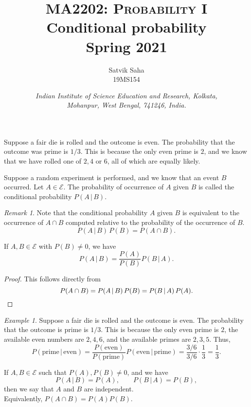 \documentclass[11pt]{article}
\title{
    \Large\textsc{MA2202: Probability I} \\
    \Huge \textbf{Conditional probability} \\
    \vspace{5pt}
    \Large{Spring 2021}
}
\author{
    \large Satvik Saha%
    \\\textsc{\small 19MS154}
}
\date{\normalsize
    \textit{Indian Institute of Science Education and Research, Kolkata, \\
    Mohanpur, West Bengal, 741246, India.} \\
}
\theoremstyle{definition}
\theoremstyle{remark}
\newtheorem*{remark}{Remark}
\newtheorem*{example}{Example}
\numberwithin{equation}{module}
\begin{document}
    \maketitle

    Suppose a fair die is rolled and the outcome is even. The probability that the
    outcome was prime is $1 /3$. This is because the only even prime is $2$, and we
    know that we have rolled one of $2, 4$ or $6$, all of which are equally likely.
    \begin{definition}
        Suppose a random experiment is performed, and we know that an event $B$
        occurred. Let $A \in \mathcal{E}$. The probability of occurrence of $A$
        given $B$ is called the conditional probability $P(A \,|\, B)$.

        \begin{remark}
            Note that the conditional probability $A$ given $B$ is equivalent to the
            occurrence of $A \cap B$ computed relative to the probability of the
            occurrence of $B$. \[
                P(A\,|\, B) \,P(B) = P(A \cap B).
            \] 
        \end{remark}
    \end{definition}
    \begin{theorem}
        If $A, B \in \mathcal{E}$ with $P(B) \neq 0$, we have \[
            P(A \,|\, B) = \frac{P(A)}{P(B)}P(B \,|\, A).
        \]
    \end{theorem}
    \begin{proof}
        This follows directly from \[
            P(A \cap B) = P(A \,|\, B) \,P(B) = P(B \,|\, A) \,P(A). \qedhere
        \] 
    \end{proof}
    \begin{example}
        Suppose a fair die is rolled and the outcome is even. The probability that
        the outcome is prime is $1 /3$. This is because the only even prime is $2$,
        the available even numbers are $2, 4, 6$, and the available primes are 
        $2, 3, 5$. Thus, \[
            P(\text{prime} \,|\, \text{even}) =
            \frac{P(\text{even})}{P(\text{prime})} P(\text{even} \,|\, \text{prime})
            = \frac{3 / 6}{3 / 6} \cdot \frac{1}{3} = \frac{1}{3}.
        \] 
    \end{example}
    
    \begin{definition}
        If $A, B \in \mathcal{E}$ such that $P(A), P(B) \neq 0$, and we have \[
            P(A \,|\, B) = P(A), \qquad P(B \,|\, A) = P(B),
        \] then we say that
        $A$ and $B$ are independent. \\

        \noindent Equivalently, $P(A \cap B) = P(A) P(B)$.
    \end{definition}
\end{document}
